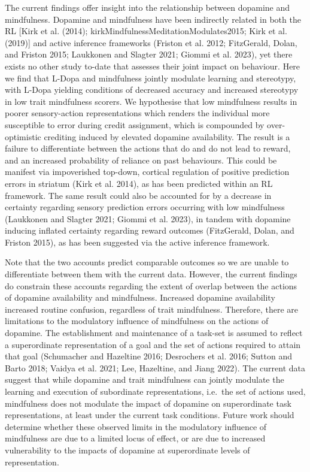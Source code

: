 \documentclass{article}
\begin{document}
The current findings offer insight into the relationship between
dopamine and mindfulness. Dopamine and mindfulness have been indirectly
related in both the RL {[}Kirk et al. (2014);
kirkMindfulnessMeditationModulates2015; Kirk et al. (2019){]} and active
inference frameworks (Friston et al. 2012; FitzGerald, Dolan, and
Friston 2015; Laukkonen and Slagter 2021; Giommi et al. 2023), yet there
exists no other study to-date that assesses their joint impact on
behaviour. Here we find that L-Dopa and mindfulness jointly modulate
learning and stereotypy, with L-Dopa yielding conditions of decreased
accuracy and increased stereotypy in low trait mindfulness scorers. We
hypothesise that low mindfulness results in poorer sensory-action
representations which renders the individual more susceptible to error
during credit assignment, which is compounded by over-optimistic
crediting induced by elevated dopamine availability. The result is a
failure to differentiate between the actions that do and do not lead to
reward, and an increased probability of reliance on past behaviours.
This could be manifest via impoverished top-down, cortical regulation of
positive prediction errors in striatum (Kirk et al. 2014), as has been
predicted within an RL framework. The same result could also be
accounted for by a decrease in certainty regarding sensory prediction
errors occurring with low mindfulness (Laukkonen and Slagter 2021;
Giommi et al. 2023), in tandem with dopamine inducing inflated certainty
regarding reward outcomes (FitzGerald, Dolan, and Friston 2015), as has
been suggested via the active inference framework.

Note that the two accounts predict comparable outcomes so we are unable
to differentiate between them with the current data. However, the
current findings do constrain these accounts regarding the extent of
overlap between the actions of dopamine availability and mindfulness.
Increased dopamine availability increased routine confusion, regardless
of trait mindfulness. Therefore, there are limitations to the modulatory
influence of mindfulness on the actions of dopamine. The establishment
and maintenance of a task-set is assumed to reflect a superordinate
representation of a goal and the set of actions required to attain that
goal (Schumacher and Hazeltine 2016; Desrochers et al. 2016; Sutton and
Barto 2018; Vaidya et al. 2021; Lee, Hazeltine, and Jiang 2022). The
current data suggest that while dopamine and trait mindfulness can
jointly modulate the learning and execution of subordinate
representations, i.e.~the set of actions used, mindfulness does not
modulate the impact of dopamine on superordinate task representations,
at least under the current task conditions. Future work should determine
whether these observed limits in the modulatory influence of mindfulness
are due to a limited locus of effect, or are due to increased
vulnerability to the impacts of dopamine at superordinate levels of
representation.
\end{document}
